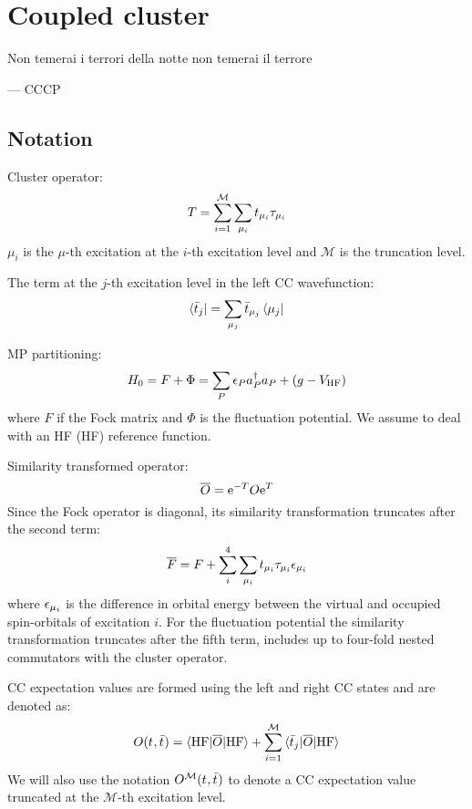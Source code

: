 \chapter{Coupled cluster}\label{ch:PCMCC}

\epigraph{Non temerai i terrori della notte non temerai il terrore}{--- \textsc{CCCP}}

\section{Notation}
Cluster operator:
\begin{equation}
  T = \sum_{i=1}^\mathcal{M}\sum_{\mu_i}t_{\mu_i}\tau_{\mu_i}
\end{equation}
$\mu_i$ is the $\mu$-th excitation at the $i$-th
excitation level and $\mathcal{M}$ is the truncation level.

The term at the $j$-th excitation level in the left CC wavefunction:
\begin{equation}
  \bra{\bar{t}_{j}} = \sum_{\mu_j}\bar{t}_{\mu_j}\bra{\mu_j}
\end{equation}

\acl{MP} partitioning:
\begin{equation}
 H_0 = F + \Phi = \sum_P\epsilon_Pa_{P}^{\dagger}a_{P} + (g- V_\mathrm{HF})
\end{equation}
where $F$ if the Fock matrix and $\Phi$ is the fluctuation potential.
We assume to deal with an \acl{HF} (\acs{HF}) reference function.

Similarity transformed operator:
\begin{equation}
  \overline{O} =\mathrm{e}^{-T}O\mathrm{e}^{T}
\end{equation}
Since the Fock operator is diagonal, its similarity transformation
truncates after the second term:
\begin{equation}
  \overline{F} = F + \sum_{i}^4\sum_{\mu_i}t_{\mu_i}\tau_{\mu_i}\epsilon_{\mu_i}
\end{equation}
where $\epsilon_{\mu_i}$ is the difference in orbital energy between the
virtual and occupied spin-orbitals of excitation $i$.
For the fluctuation potential the similarity transformation truncates
after the fifth term, \ie{} includes up to four-fold nested commutators
with the cluster operator.

\acs{CC} expectation values are formed using the left and
right \acs{CC} states and are denoted as:
\begin{equation}
  O(t_{}, \bar{t}_{}) = \braket{\mathrm{HF} | \overline{O} | \mathrm{HF} }
  + \sum_{i=1}^{\mathcal{M}}\braket{\bar{t}_{j} | \overline{O} | \mathrm{HF} }
\end{equation}
We will also use the notation $O^\mathcal{M}(t_{}, \bar{t}_{})$ to
denote a \acs{CC} expectation value truncated at the $\mathcal{M}$-th
excitation level.

